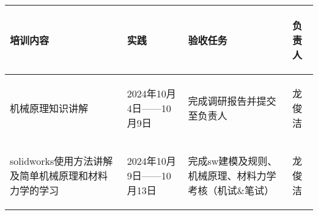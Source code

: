 
\begin{longtable}{ p{1.5cm} | p{3cm} | p{6cm} | p{4.3cm} |}

    \hline

    \endfoot
    
    \rowcolor{tabhdcolor}

        \begin{center}
            培训内容
        \end{center} &
        \begin{center}
            实践
        \end{center} &
        \begin{center}
            验收任务
        \end{center} &
        \begin{center}
            负责人
        \end{center}\\

    \hline

    \endhead

        \begin{center}
            机械原理知识讲解
        \end{center} &
        \begin{center}
            2024年10月4日——10月9日
        \end{center} &
        \begin{center}
            完成调研报告并提交至负责人
        \end{center} &
        \begin{center}
            龙俊洁
        \end{center}\\
        
    \hline
        \begin{center}
            solidworks使用方法讲解及简单机械原理和材料力学的学习
        \end{center}&
        \begin{center}
            2024年10月9日——10月13日
        \end{center}&
        \begin{center}
            完成sw建模及规则、机械原理、材料力学考核（机试\&笔试）
        \end{center}&
        \begin{center}
            龙俊洁
        \end{center}\\
        

\end{longtable}
